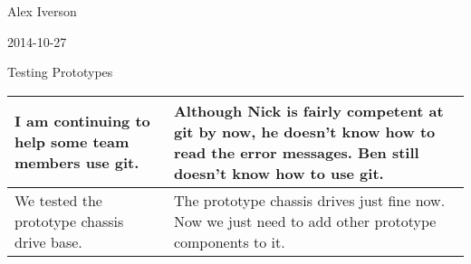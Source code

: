 Alex Iverson

2014-10-27

Testing Prototypes

\begin{tabular}{|p{5cm}|p{5cm}|}
 \hline
 I am continuing to help some team members use git.&
 Although Nick is fairly competent at git by now, he doesn't know how to read the error messages. Ben still doesn't know how to use git.\\
 \hline
 We tested the prototype chassis drive base.&
 The prototype chassis drives just fine now. Now we just need to add other prototype components to it.\\
 \hline
\end{tabular}
